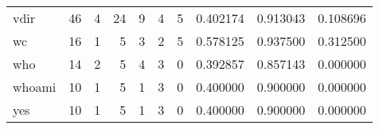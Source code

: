 \begin{tabular}{lrrrrrrrrr}
vdir      &                                       46 &                                                  4 &                                                 24 &                                                  9 &                                                  4 &                                                  5 &                                           0.402174 &                               0.913043 &                             0.108696 \\
wc        &                                       16 &                                                  1 &                                                  5 &                                                  3 &                                                  2 &                                                  5 &                                           0.578125 &                               0.937500 &                             0.312500 \\
who       &                                       14 &                                                  2 &                                                  5 &                                                  4 &                                                  3 &                                                  0 &                                           0.392857 &                               0.857143 &                             0.000000 \\
whoami    &                                       10 &                                                  1 &                                                  5 &                                                  1 &                                                  3 &                                                  0 &                                           0.400000 &                               0.900000 &                             0.000000 \\
yes       &                                       10 &                                                  1 &                                                  5 &                                                  1 &                                                  3 &                                                  0 &                                           0.400000 &                               0.900000 &                             0.000000 \\
\bottomrule
\end{tabular}
